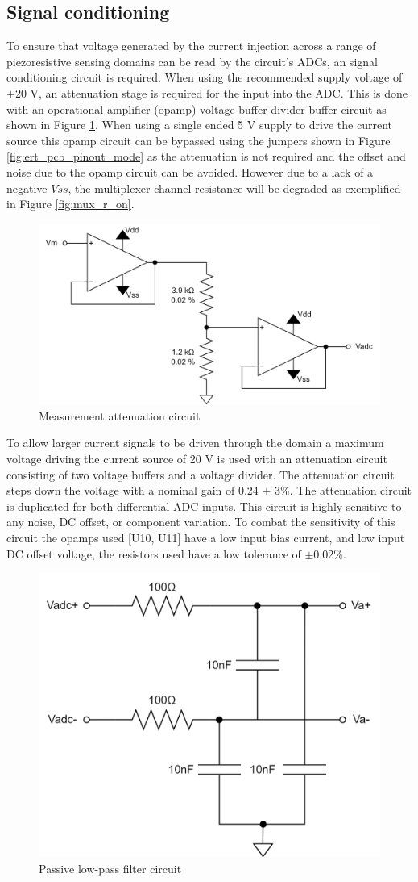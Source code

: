 \subsection{Signal conditioning}
To ensure that voltage generated by the current injection across a range of piezoresistive sensing domains can be read by the circuit's ADCs, an signal conditioning circuit is required.
When using the recommended supply voltage of $\pm$20 V, an attenuation stage is required for the input into the ADC. This is done with an operational amplifier (opamp) voltage buffer-divider-buffer circuit as shown in Figure \ref{fig:opamp_ckt}. When using a single ended 5 V supply to drive the current source this opamp circuit can be bypassed using the jumpers shown in Figure \ref{fig:ert_pcb_pinout_mode} as the attenuation is not required and the offset and noise due to the opamp circuit can be avoided. However due to a lack of a negative $Vss$, the multiplexer channel resistance will be degraded as exemplified in Figure \ref{fig:mux_r_on}.
\begin{figure}[H]
\centering
\includegraphics[width=0.5\linewidth]{Figures/opamp_ckt_ert_pcb.png}
\caption{Measurement attenuation circuit}
\label{fig:opamp_ckt}
\end{figure}
To allow larger current signals to be driven through the domain a maximum voltage driving the current source of 20 V is used with an attenuation circuit consisting of two voltage buffers and a voltage divider. The attenuation circuit steps down the voltage with a nominal gain of 0.24 $\pm$ 3\%. The attenuation circuit is duplicated for both differential ADC inputs. This circuit is highly sensitive to any noise, DC offset, or component variation. To combat the sensitivity of this circuit the opamps used [U10, U11] have a low input bias current, and low input DC offset voltage, the resistors used have a low tolerance of $\pm$0.02\%.
\begin{figure}[H]
\centering
\includegraphics[width=0.4\linewidth]{Figures/adc_filter_ckt.png}
\caption{Passive low-pass filter circuit}
\label{fig:adc_filter_ckt}
\end{figure}
